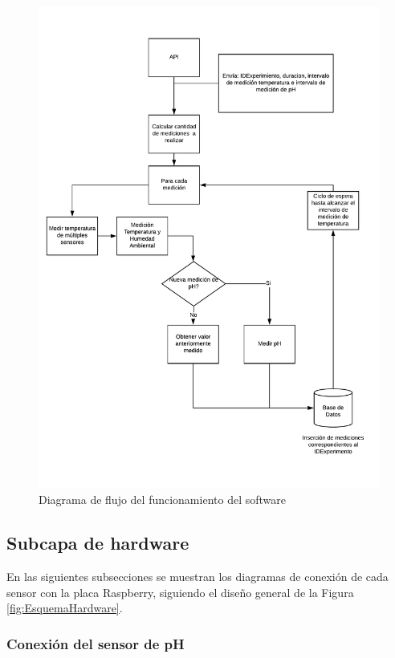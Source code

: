         \begin{figure}
        \centering
            \includegraphics[scale=0.75]{hardware/DiagramadeFlujoPython.pdf}
            \caption{Diagrama de flujo del funcionamiento del software }
            \label{FlujoPython}
        \end{figure}

    \subsection{Subcapa de hardware}
        \par En las siguientes subsecciones se muestran los diagramas de conexión de cada sensor con la placa Raspberry, siguiendo el diseño general de la Figura \ref{fig:EsquemaHardware}.

    \subsubsection{Conexión del sensor de pH}

